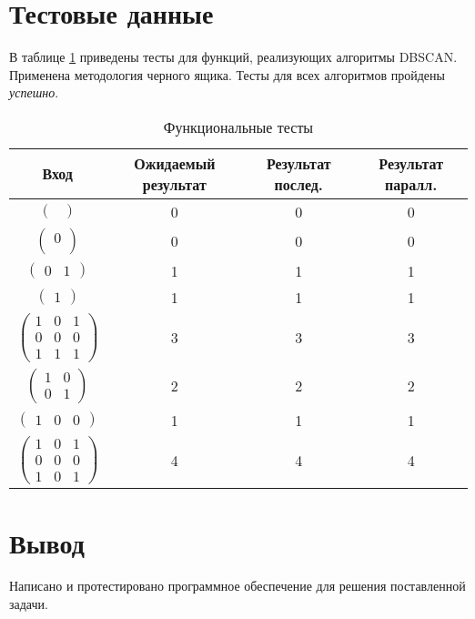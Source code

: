 \section{Тестовые данные}

В таблице \ref{tbl:functional_test} приведены тесты для функций, реализующих алгоритмы DBSCAN. Применена методология черного ящика. Тесты для всех алгоритмов пройдены \textit{успешно}.


\begin{table}[ht!]
	\begin{center}
		\captionsetup{justification=raggedright,singlelinecheck=off}
		\caption{\label{tbl:functional_test} Функциональные тесты}
		\begin{tabular}{|c|c|c|c|}
			\hline
			Вход & Ожидаемый результат & Результат послед. & Результат паралл. 
			\\ \hline
			$\begin{pmatrix}
				\\
			\end{pmatrix}$ &
			0&
			0 & 0
			
			\\ \hline
			$\begin{pmatrix}
			0\\
			\end{pmatrix}$ &
			0 &
			0 & 0
			
			\\ \hline
			$\begin{pmatrix}
				0 & 1
			\end{pmatrix}$ &
			1 &
			1 & 1
			
			\\ \hline
			$\begin{pmatrix}
				1
			\end{pmatrix}$ &
			1 &
			1 & 1
			
			\\ \hline
			$\begin{pmatrix}
				1 & 0 & 1\\
				0 & 0 & 0\\
				1 & 1 & 1
			\end{pmatrix}$ &
			3 &
			3 &3
			
			\\ \hline
			$\begin{pmatrix}
				1 & 0 \\
				0 & 1 
			\end{pmatrix}$ &
			2 &
			2 & 2               
			
			\\ \hline
			$\begin{pmatrix}
				1 & 0 & 0
			\end{pmatrix}$ &
			1&
			1 & 1
			
			\\ \hline
			$\begin{pmatrix}
				1 & 0 & 1 \\
				0 & 0 & 0 \\
				1 & 0 & 1
			\end{pmatrix}$ &
			4 &
			4  & 4                
			\\ \hline
		\end{tabular}
	\end{center}
\end{table}

\section*{Вывод}
Написано и протестировано программное обеспечение для решения поставленной задачи.